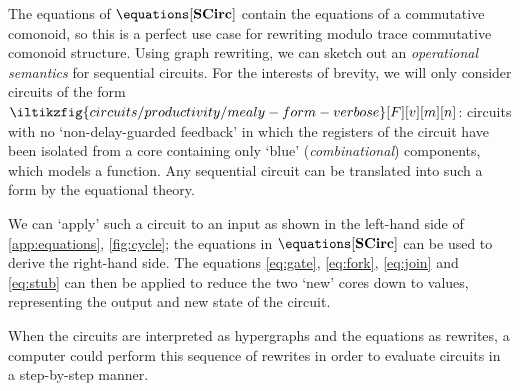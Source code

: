 The equations of \(\equations[\mathbf{SCirc}]\) contain the equations of a
commutative comonoid, so this is a perfect use case for rewriting modulo
trace commutative comonoid structure.
Using graph rewriting, we can sketch out an \emph{operational semantics} for
sequential circuits.
For the interests of brevity, we will only consider circuits of the form \(
    \iltikzfig{circuits/productivity/mealy-form-verbose}[F][v][m][n]
\): circuits with no `non-delay-guarded feedback' in which the registers of the
circuit have been isolated from a core containing only `blue'
(\emph{combinational}) components, which models a function.
Any sequential circuit can be translated into such a form by the equational
theory.

We can `apply' such a circuit to an input as shown in the left-hand side of
\cref{app:equations}, \cref{fig:cycle}; the equations in
\(\equations[\mathbf{SCirc}]\) can be used to derive the right-hand side.
The equations \eqref{eq:gate}, \eqref{eq:fork}, \eqref{eq:join} and
\eqref{eq:stub} can then be applied to reduce the two `new' cores down to
values, representing the output and new state of the circuit.

When the circuits are interpreted as hypergraphs and the equations as rewrites,
a computer could perform this sequence of rewrites in order to evaluate circuits
in a step-by-step manner.
